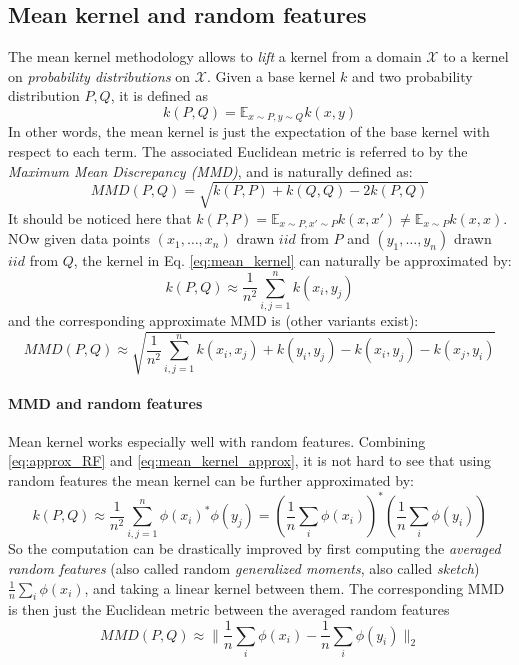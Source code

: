 \subsection{Mean kernel and random features} \label{subsec:MMD}
The mean kernel methodology allows to \emph{lift} a kernel from a domain $\mathcal{X}$ to a kernel on \emph{probability distributions} on $\mathcal{X}$. Given a base kernel $k$ and two probability distribution $P,Q$, it is defined as
\begin{equation}\label{eq:mean_kernel}
k(P,Q) = \mathbb{E}_{x \sim P, y \sim Q} k(x,y)
\end{equation}
In other words, the mean kernel is just the expectation of the base kernel with respect to each term. The associated Euclidean metric is referred to by the  \emph{Maximum Mean Discrepancy (MMD)}, and is naturally defined as:
\begin{equation}\label{eq:MMD}
MMD(P,Q) = \sqrt{k(P,P) + k(Q,Q) - 2k(P,Q)}
\end{equation}
It should be noticed here that $k(P,P) = \mathbb{E}_{x \sim P, x' \sim P} k(x,x') \neq \mathbb{E}_{x \sim P} k(x,x)$.
NOw given data points $(x_1, \ldots, x_n)$ drawn $iid$ from $P$ and $(y_1, \ldots, y_n)$ drawn $iid$ from $Q$, the kernel in Eq. \ref{eq:mean_kernel} can naturally be approximated by:
\begin{equation}\label{eq:mean_kernel_approx}
k(P,Q) \approx \frac{1}{n^2} \sum_{i,j=1}^n k(x_i,y_j)
\end{equation}
and the corresponding approximate MMD is (other variants exist):
\[
MMD(P,Q) \approx \sqrt{\frac{1}{n^2} \sum_{i,j=1}^n k(x_i,x_j) + k(y_i,y_j) - k(x_i,y_j) - k(x_j, y_i)}
\]

\paragraph{MMD and random features}
Mean kernel works especially well with random features. Combining \eqref{eq:approx_RF} and \eqref{eq:mean_kernel_approx}, it is not hard to see that using random features the mean kernel can be further approximated by:
\begin{equation}
\label{eq:mean_kernel_RF}
k(P,Q) \approx \frac{1}{n^2} \sum_{i,j=1}^n \phi(x_i)^*\phi(y_j) = \left(\frac{1}{n} \sum_i \phi(x_i)\right)^* \left(\frac{1}{n} \sum_i \phi(y_i)\right)
\end{equation}
So the computation can be drastically improved by first computing the \emph{averaged random features} (also called random \emph{generalized moments}, also called \emph{sketch}) $\frac{1}{n} \sum_i \phi(x_i)$, and taking a linear kernel between them. The corresponding MMD is then just the Euclidean metric between the averaged random features
\[
MMD(P,Q) \approx \| \frac{1}{n} \sum_i \phi(x_i) - \frac{1}{n} \sum_i \phi(y_i)\|_2
\]

